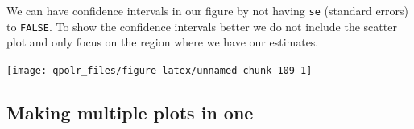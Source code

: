 \documentclass[12pt,oneside]{reedthesis}
\theoremstyle{definition}
\theoremstyle{definition}
\theoremstyle{definition}
\theoremstyle{remark}
\begin{document}
  We can have confidence intervals in our figure by not having \texttt{se}
  (standard errors) to \texttt{FALSE}. To show the confidence intervals
  better we do not include the scatter plot and only focus on the region
  where we have our estimates.
  \begin{Shaded}
  \begin{Highlighting}[]
  \NormalTok{(}\OperatorTok{+}
  \StringTok{  }\NormalTok{(} \NormalTok{(}\NormalTok{, }\NormalTok{)) }\OperatorTok{+}
  \StringTok{  }\NormalTok{() }\OperatorTok{+}\StringTok{ }
  \StringTok{  }\NormalTok{(}
       \NormalTok{,}
       \NormalTok{,}
       
  \NormalTok{  ) }\OperatorTok{+}
  \StringTok{  }\NormalTok{(}\NormalTok{) }\OperatorTok{+}
  \StringTok{  }\NormalTok{(}\NormalTok{) }\OperatorTok{+}
  \StringTok{  }\NormalTok{(}\NormalTok{)}
  \end{Highlighting}
  \end{Shaded}
  \begin{center}\texttt{[image: qpolr\_files/figure-latex/unnamed-chunk-109-1]} \end{center}
  
  \subsection{Making multiple plots in
  one}\label{making-multiple-plots-in-one}
  
\end{document}
